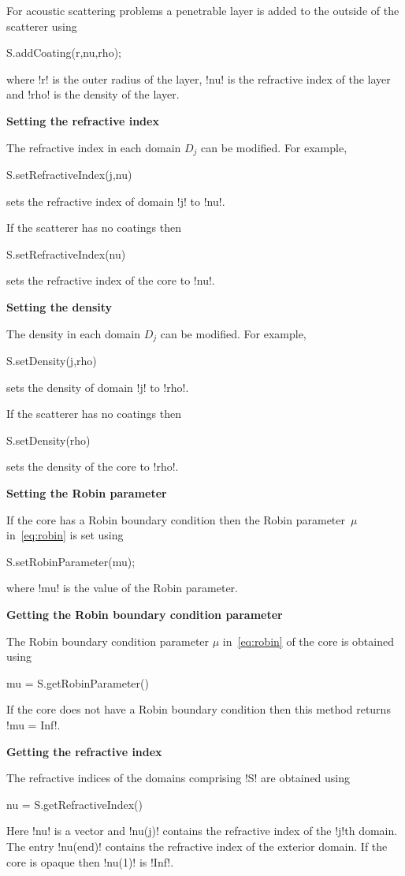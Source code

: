 \documentclass[11pt,letterpaper]{article}
\newcommand{\techheading}[1]{%
    \par\vspace{-0.3\parskip}\noindent\hspace{-1cm}\textbf{#1}%
    \par\vspace{-0.5\parskip}\noindent\nopagebreak\ignorespaces}
\begin{document}
For acoustic scattering problems
a penetrable layer is added to the outside of the scatterer using
\begin{matlab}
S.addCoating(r,nu,rho);
\end{matlab}
where !r! is the outer radius of the layer, !nu! is the refractive
index of the layer
and !rho! is the density of the layer.

\techheading{Setting the refractive index}
The refractive index in each domain $D_j$ can be modified.
For example,
\begin{matlab}
S.setRefractiveIndex(j,nu)
\end{matlab}
sets the refractive index of domain !j! to !nu!.

If the scatterer has no coatings then
\begin{matlab}
S.setRefractiveIndex(nu)
\end{matlab}
sets the refractive index of the core to !nu!.

\techheading{Setting the density}
The density in each domain $D_j$ can be modified.
For example,
\begin{matlab}
S.setDensity(j,rho)
\end{matlab}
sets the density of domain !j! to !rho!.

If the scatterer has no coatings then
\begin{matlab}
S.setDensity(rho)
\end{matlab}
sets the density of the core to !rho!.

\techheading{Setting the Robin parameter}
If the core has a Robin boundary condition then the
Robin parameter~$\mu$ in~\eqref{eq:robin} is set using
\begin{matlab}
S.setRobinParameter(mu);
\end{matlab}
where !mu! is the value of the Robin parameter.

\techheading{Getting the Robin boundary condition parameter}
The Robin boundary condition parameter $\mu$ in~\eqref{eq:robin}
of the core is obtained using
\begin{matlab}
mu = S.getRobinParameter()
\end{matlab}
If the core does not have a Robin boundary condition then
this method returns !mu = Inf!.

\techheading{Getting the refractive index}
The refractive indices of the domains comprising !S! are obtained
using
\begin{matlab}
nu = S.getRefractiveIndex()
\end{matlab}
Here !nu! is a vector and !nu(j)! contains the refractive index of 
the !j!th domain.
The entry !nu(end)! contains the refractive index of the exterior domain.
If the core is opaque then !nu(1)! is !Inf!.
\end{document}
